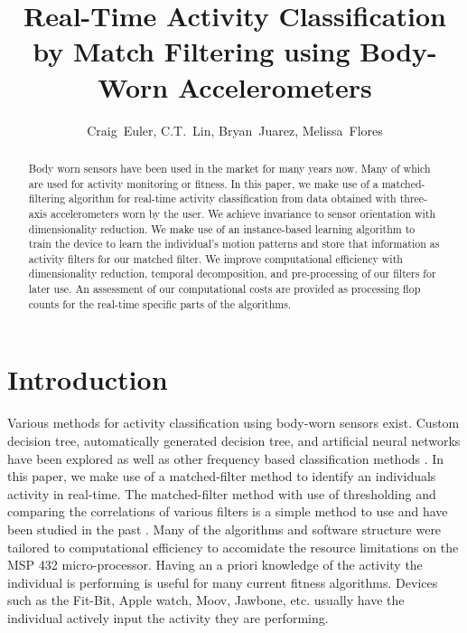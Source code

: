 \documentclass[journal]{IEEEtran}
\begin{document}
%
\title{Real-Time Activity Classification by Match Filtering using Body-Worn Accelerometers}
%
\author{Craig~Euler, C.T.~Lin, Bryan~Juarez, Melissa~Flores}
%
\maketitle
%
\begin{abstract}
Body worn sensors have been used in the market for many years now.
Many of which are used for activity monitoring or fitness.
In this paper, we make use of a matched-filtering algorithm for real-time activity classification from data obtained with three-axis accelerometers worn by the user.
We achieve invariance to sensor orientation with dimensionality reduction.
We make use of an instance-based learning algorithm to train the device to learn the individual's motion patterns and store that information as activity filters for our matched filter.
We improve computational efficiency with dimensionality reduction, temporal decomposition, and pre-processing of our filters for later use.
An assessment of our computational costs are provided as processing flop counts for the real-time specific parts of the algorithms.
\end{abstract}
%
\section{Introduction}
Various methods for activity classification using body-worn sensors exist.
Custom decision tree, automatically generated decision tree, and artificial neural networks \cite{parkka_ermes_korpipaa_mantyjarvi_peltola_korhonen_2006} have been explored as well as other frequency based classification methods \cite{sharma_purwar_lee_lee_chung_2008}.
In this paper, we make use of a matched-filter method to identify an individual\textquotesingle s activity in real-time.
The matched-filter method with use of thresholding and comparing the correlations of various filters is a simple method to use and have been studied in the past \cite{giannakis_tsatsanis_1990}.
Many of the algorithms and software structure were tailored to computational efficiency to accomidate the resource limitations on the MSP 432 micro-processor.
Having an a priori knowledge of the activity the individual is performing is useful for many current fitness algorithms.
Devices such as the Fit-Bit, Apple watch, Moov, Jawbone, etc. usually have the individual actively input the activity they are performing.
\end{document}
